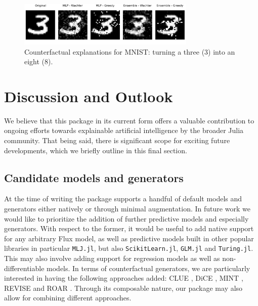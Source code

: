 \documentclass[
  letterpaper,
  DIV=11,
  numbers=noendperiod]{scrartcl}
\begin{document}
\begin{figure}

{\centering \includegraphics[width=3.33333in,height=0.83333in]{www/mnist_3_to_8.png}

}

\caption{\label{fig-mnist-3to8}Counterfactual explanations for MNIST:
turning a three (3) into an eight (8).}

\end{figure}

\hypertarget{sec-outlook}{%
\section{Discussion and Outlook}\label{sec-outlook}}

We believe that this package in its current form offers a valuable
contribution to ongoing efforts towards explainable artificial
intelligence by the broader Julia community. That being said, there is
significant scope for exciting future developments, which we briefly
outline in this final section.

\hypertarget{candidate-models-and-generators}{%
\subsection{Candidate models and
generators}\label{candidate-models-and-generators}}

At the time of writing the package supports a handful of default models
and generators either natively or through minimal augmentation. In
future work we would like to prioritize the addition of further
predictive models and especially generators. With respect to the former,
it would be useful to add native support for any arbitrary Flux model,
as well as predictive models built in other popular libraries in
particular \texttt{MLJ.jl}, but also \texttt{ScikitLearn.jl},
\texttt{GLM.jl} and \texttt{Turing.jl}. This may also involve adding
support for regression models as well as non-differentiable models. In
terms of counterfactual generators, we are particularly interested in
having the following approaches added: CLUE \cite{antoran2020getting},
DiCE \cite{mothilal2020explaining}, MINT \cite{karimi2021algorithmic},
REVISE \cite{joshi2019realistic} and ROAR \cite{upadhyay2021robust}.
Through its composable nature, our package may also allow for combining
different approaches.
\end{document}
